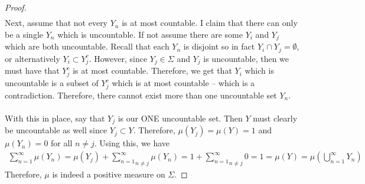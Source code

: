 \documentclass[10pt,a4paper]{article}
\theoremstyle{definition}
\theoremstyle{definition}
\numberwithin{equation}{section}
\begin{document}
\begin{proof}
\begin{align*}
\end{align*}
Next, assume that not every $Y_n$ is at most countable. I claim that there can only be a single $Y_n$ which is uncountable. If not assume there are some $Y_i$ and $Y_j$ which are both uncountable. Recall that each $Y_n$ is disjoint so in fact $Y_i \cap Y_j = \emptyset$, or alternatively $Y_i \subset Y_j^c$. However, since $Y_j \in \Sigma$ and $Y_j$ is uncountable, then we must have that $Y_j^c$ is at most countable. Therefore, we get that $Y_i$ which is uncountable is a subset of $Y_j^c$ which is at most countable -- which is a contradiction. Therefore, there cannot exist more than one uncountable set $Y_n$. 
\\
\\With this in place, say that $Y_j$ is our ONE uncountable set. Then $Y$ must clearly be uncountable as well since $Y_j \subset Y$. Therefore, $\mu(Y_j) = \mu(Y) = 1$ and $\mu(Y_n) = 0$ for all $n \neq j$. Using this, we have
\begin{align*}
\sum_{n = 1}^\infty \mu(Y_n) = \mu(Y_j) + \underset{n \neq j}{\sum_{n = 1}^\infty} \mu(Y_n) = 1 + \underset{n \neq j}{\sum_{n = 1}^\infty} 0 = 1 = \mu(Y) = \mu\left(\bigcup_{n = 1}^\infty Y_n \right)
\end{align*}
Therefore, $\mu$ is indeed a positive measure on $\Sigma$. 
\end{proof}
\end{document}
